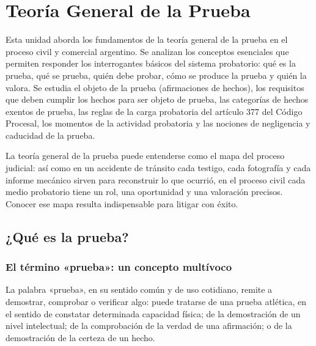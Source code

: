 \documentclass[12pt,oneside]{book}
\begin{document}
\tableofcontents


\chapter{Teoría General de la Prueba}

Esta unidad aborda los fundamentos de la teoría general de la prueba en el proceso civil y comercial argentino. Se analizan los conceptos esenciales que permiten responder los interrogantes básicos del sistema probatorio: qué es la prueba, qué se prueba, quién debe probar, cómo se produce la prueba y quién la valora. Se estudia el objeto de la prueba (afirmaciones de hechos), los requisitos que deben cumplir los hechos para ser objeto de prueba, las categorías de hechos exentos de prueba, las reglas de la carga probatoria del artículo 377 del Código Procesal, los momentos de la actividad probatoria y las nociones de negligencia y caducidad de la prueba.

La teoría general de la prueba puede entenderse como el mapa del proceso judicial: así como en un accidente de tránsito cada testigo, cada fotografía y cada informe mecánico sirven para reconstruir lo que ocurrió, en el proceso civil cada medio probatorio tiene un rol, una oportunidad y una valoración precisos. Conocer ese mapa resulta indispensable para litigar con éxito.

\section{¿Qué es la prueba?}

\subsection{El término «prueba»: un concepto multívoco}

La palabra «prueba», en su sentido común y de uso cotidiano, remite a demostrar, comprobar o verificar algo: puede tratarse de una prueba atlética, en el sentido de constatar determinada capacidad física; de la demostración de un nivel intelectual; de la comprobación de la verdad de una afirmación; o de la demostración de la certeza de un hecho.
\end{document}
